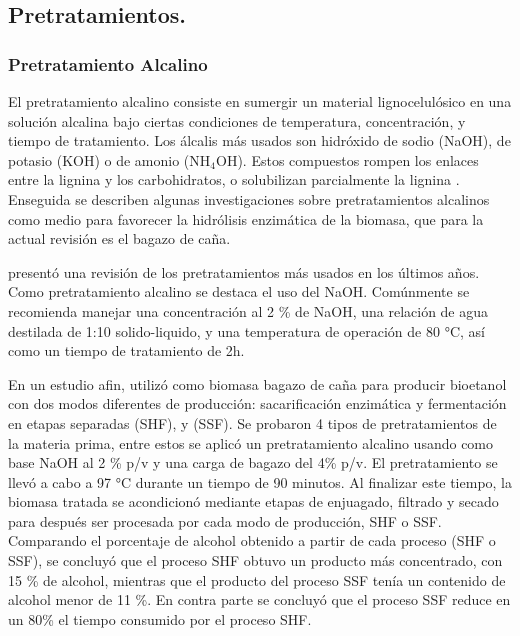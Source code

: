 \documentclass[12pt]{article}
\begin{document}




\subsection{Pretratamientos.}



\subsubsection{Pretratamiento Alcalino}

El pretratamiento alcalino consiste en sumergir un material lignocelulósico en una solución alcalina bajo ciertas condiciones de temperatura, concentración, y tiempo de tratamiento. Los álcalis más usados son hidróxido de sodio (NaOH), de potasio (KOH) o de amonio (NH$_4$OH). Estos compuestos rompen los enlaces entre la lignina y los carbohidratos, o solubilizan parcialmente la lignina \cite{Galbe2012}.
Enseguida se describen algunas investigaciones sobre pretratamientos alcalinos como medio para favorecer la hidrólisis enzimática de la biomasa, que para la actual revisión es el bagazo de caña.

\cite{Nasution_2022} presentó una revisión de los pretratamientos más usados en los últimos años. Como pretratamiento alcalino se destaca el uso del NaOH. Comúnmente se recomienda manejar una concentración al 2 \% de NaOH, una relación de agua destilada de 1:10 solido-liquido, y una temperatura de operación de 80 °C, así como un tiempo de tratamiento de 2h.

En un estudio afin, \cite{Arturo2022evaluacion} utilizó como biomasa bagazo de caña para producir bioetanol con dos modos diferentes de producción: sacarificación enzimática y fermentación en etapas separadas (SHF), y (SSF). Se probaron 4 tipos de pretratamientos de la materia prima, entre estos se aplicó un pretratamiento alcalino usando como base NaOH al 2 \% p/v y una carga de bagazo del 4\% p/v. El pretratamiento se llevó a cabo a 97 °C durante un tiempo de 90 minutos. Al finalizar este tiempo, la biomasa tratada se acondicionó mediante etapas de enjuagado, filtrado y secado para después ser procesada por cada modo de producción, SHF o SSF. Comparando el porcentaje de alcohol obtenido a partir de cada proceso (SHF o SSF), se concluyó que el proceso SHF obtuvo un producto más concentrado, con 15 \% de alcohol, mientras que el producto del proceso SSF tenía un contenido de alcohol menor de 11 \%. En contra parte se concluyó que el proceso SSF reduce en un 80\% el tiempo consumido por el proceso SHF.
\end{document}
